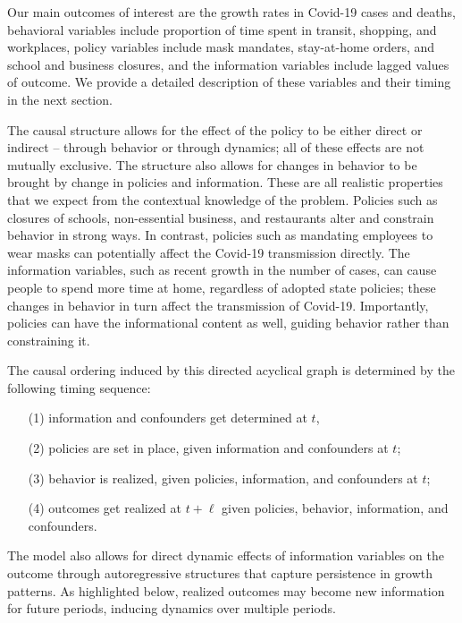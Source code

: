 \documentclass[11pt,reqno,letter]{amsart}
\theoremstyle{definition}
\begin{document}
Our main outcomes of interest are the growth rates in Covid-19 cases and deaths,  behavioral variables include proportion of time spent in transit, shopping, and workplaces, policy variables include mask mandates, stay-at-home orders, and school and business closures, and the information variables include lagged values of outcome. We provide a detailed description of these variables and their timing in the next section.


The causal structure  allows for  the effect of the policy to be either direct or indirect -- through behavior or through dynamics;  all of these effects are not mutually exclusive. The structure also allows for changes in behavior to be brought by change in policies and information. These are all realistic properties that we expect from the contextual knowledge of the problem. Policies such as closures of schools, non-essential business, and restaurants alter and constrain behavior in strong ways.  In contrast, policies such as mandating employees to wear masks can potentially affect the Covid-19 transmission directly.  The information variables, such as recent growth in the number of cases, can cause people to spend more time at home, regardless of adopted state policies; these changes in behavior in turn affect the transmission of Covid-19.  Importantly, policies can have the informational content as well, guiding behavior rather than constraining it.

The causal ordering induced by this directed acyclical graph is determined by the following
timing sequence: %
\begin{itemize}
\item[(1)]  information and confounders get determined at $t$,
\item[(2)] policies are set in place, given information and confounders at $t$;
\item[(3)] behavior is realized, given policies, information, and confounders at $t$;
\item[(4)] outcomes get realized at $t+\ell$ given policies, behavior, information, and confounders.
\end{itemize}

The model also allows for direct dynamic effects of information variables on the outcome through autoregressive structures that capture persistence in growth patterns. As  highlighted below, realized outcomes may become new information for future periods, inducing dynamics over multiple periods.
\end{document}
